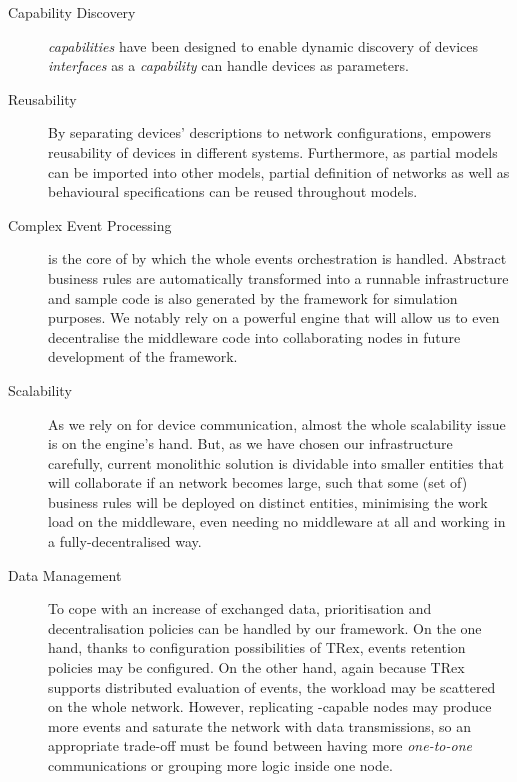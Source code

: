 \begin{description}
	\item[Capability Discovery] \IOTDSL \textsl{capabilities} have been designed to enable dynamic discovery of devices \textit{interfaces} as a \textsl{capability} can handle devices as parameters.
	
	\item[Reusability] By separating devices' descriptions to network configurations, \IOTDSL empowers reusability of devices in different \IOT systems. Furthermore, as partial \IOTDSL models can be imported into other models, partial definition of networks as well as behavioural specifications can be reused throughout models.
	
	\item[Complex Event Processing] \CEP is the core of \IOTDSL by which the whole events orchestration is handled. Abstract business rules are automatically transformed into a runnable infrastructure and sample code is also generated by the framework for simulation purposes. We notably rely on a powerful \CEP engine that will allow us to even decentralise the middleware code into collaborating nodes in future development of the framework.	
	
	\item[Scalability] As we rely on \CEP for device communication, almost the whole scalability issue is on the \CEP engine's hand. But, as we have chosen our infrastructure carefully, current monolithic solution is dividable into smaller entities that will collaborate if an \IOT network becomes large, such that some (set of) business rules will be deployed on distinct entities, minimising the work load on the middleware, even needing no middleware at all and working in a fully-decentralised way.
	
	\item[Data Management] To cope with an increase of exchanged data, prioritisation and decentralisation policies can be handled by our framework. On the one hand, thanks to configuration possibilities of TRex, events retention policies may be configured. On the other hand, again because TRex supports distributed evaluation of events, the workload may be scattered on the whole network. However, replicating \CEP-capable nodes may produce more events and saturate the network with data transmissions, so an appropriate trade-off must be found between having more \textit{one-to-one} communications or grouping more logic inside one node.
	
\end{description}

